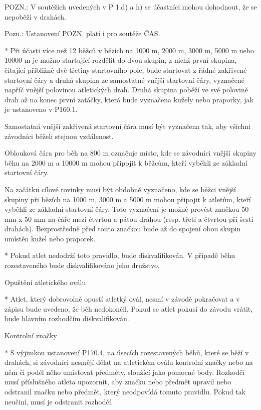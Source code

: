   POZN.:  V soutěžích uvedených v P 1.d) a h) se účastníci mohou dohodnout, že se nepoběží v drahách.

  Pozn.: Ustanovení POZN.  platí i pro soutěže ČAS.

  * Při účasti více než 12 běžců v bězích na 1000 m, 2000 m, 3000 m, 5000 m nebo 10000 m je možno startující rozdělit do dvou skupin, z nichž první skupina, čítající přibližně dvě třetiny startovního pole, bude startovat z řádné zakřivené startovní čáry a druhá skupina ze samostatné vnější startovní čáry, vyznačené napříč vnější polovinou atletických drah. Druhá skupina poběží ve své polovině drah až na konec první zatáčky, která bude vyznačena kužely nebo praporky, jak je ustanoveno v P160.1.

  Samostatná vnější zakřivená startovní čára musí být vyznačena tak, aby všichni závodníci běželi stejnou vzdálenost.

  Oblouková čára pro běh na 800 m označuje místo, kde se závodníci vnější skupiny běhu na 2000 m a 10000 m mohou připojit k běžcům, kteří vyběhli ze základní startovní čáry.

  Na začátku cílové rovinky musí být obdobně vyznačeno, kde se běžci vnější skupiny při bězích na 1000 m, 3000 m a 5000 m mohou připojit k atletům, kteří vyběhli ze základní startovní čáry. Toto vyznačení je možné provést značkou 50 mm x 50 mm na čáře mezi čtvrtou a pátou dráhou (resp. třetí a čtvrtou při šesti drahách). Bezprostředně před touto značkou bude až do spojení obou skupin umístěn kužel nebo praporek.

  * Pokud atlet nedodrží toto pravidlo, bude diskvalifikován. V případě běhu rozestaveného bude diskvalifikováno jeho družstvo.
  \enditems

Opuštění atletického oválu

* Atlet, který dobrovolně opustí atletký ovál, nesmí v závodě pokračovat a v zápisu bude uvedeno, že běh nedokončil. Pokud se atlet pokusí do závodu vrátit, bude hlavním rozhodčím diskvalifikován.

Kontrolní značky

* S výjimkou ustanovení P170.4, na úsecích rozestavených běhů, které se běží v drahách, si závodníci nesmějí dělat na atletickém oválu kontrolní značky nebo na něm či podél něho umisťovat předměty, sloužící jako pomocné body. Rozhodčí musí příslušného atleta upozornit, aby značku nebo předmět upravil nebo odstranil značku nebo předmět, který neodpovídá tomuto pravidlu. Pokud tak neučiní, musí je odstranit rozhodčí.

